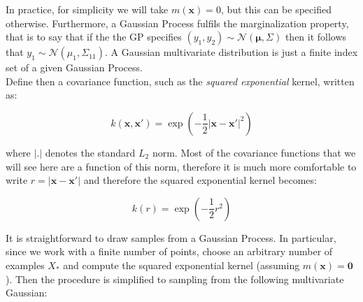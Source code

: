 \documentclass[10pt,a4paper,twoside]{book}
\begin{document}
In practice, for simplicity we will take $m(\boldsymbol{x}) = 0$, but this can be specified otherwise. Furthermore, a Gaussian Process fulfils the marginalization property, that is to say that if the the GP specifies $(y_1, y_2) \sim \mathcal{N}(\boldsymbol{\mu}, \Sigma)$ then it follows that $y_1 \sim \mathcal{N}(\mu_1, \Sigma_{11})$. A Gaussian multivariate distribution is just a finite index set of a given Gaussian Process. \\

%

Define then a covariance function, such as the \textit{squared exponential} kernel, written as:

\begin{equation}
k(\boldsymbol{x}, \boldsymbol{x}') = \exp\left(-\dfrac{1}{2}|\boldsymbol{x} - \boldsymbol{x}'|^2\right)
\end{equation}

where $|.|$ denotes the standard $L_2$ norm. Most of the covariance functions that we will see here are a function of this norm, therefore it is much more comfortable to write $r = |\boldsymbol{x} - \boldsymbol{x}'|$ and therefore the squared exponential kernel becomes:

\begin{equation}
\label{sqexp}
k(r) = \exp\left(-\dfrac{1}{2}r^2\right)
\end{equation}

It is straightforward to draw samples from a Gaussian Process. In particular, since we work with a finite number of points, choose an arbitrary number of examples $X_*$ and compute the squared exponential kernel (assuming $m(\boldsymbol{x})=\boldsymbol{0}$). Then the procedure is simplified to sampling from the following multivariate Gaussian:
\end{document}
